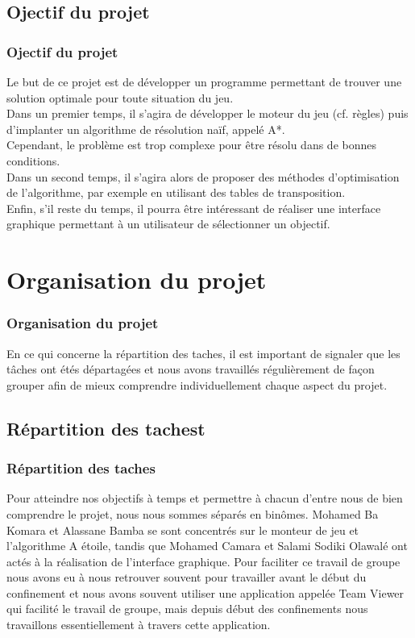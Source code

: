 \documentclass{beamer}
\begin{document}
	\subsection{Ojectif du projet}
	\begin{frame}
		\frametitle{Ojectif du projet}
		
		Le but de ce projet est de développer un programme permettant de trouver une solution optimale pour toute situation du jeu. 
		\\Dans un premier temps, il s'agira de développer le moteur du jeu (cf. règles) puis d'implanter un algorithme de résolution naïf, appelé A*. 
		\\Cependant, le problème est trop complexe pour être résolu dans de bonnes conditions. 
		\\Dans un second temps, il s'agira alors de proposer des méthodes d'optimisation de l'algorithme, par exemple en utilisant des tables de transposition. 
		\\Enfin, s'il reste du temps, il pourra être intéressant de réaliser une interface graphique permettant à un utilisateur de sélectionner un objectif. 
		
	\end{frame}
	
	
	\section{Organisation du projet}
	
	\begin{frame}
		\frametitle{Organisation du projet}
		
		En ce qui concerne la répartition des taches, il est important de signaler que les tâches ont étés  départagées et nous avons travaillés régulièrement de façon grouper	afin de mieux comprendre individuellement chaque aspect du projet. 
		
	\end{frame}
	
	\subsection{Répartition des tachest}
	\begin{frame}
		\frametitle{Répartition des taches}
		
		Pour atteindre nos objectifs à temps et permettre à chacun d’entre nous de bien comprendre le projet, nous nous sommes séparés en binômes. Mohamed Ba Komara et Alassane Bamba se sont concentrés sur le monteur de jeu et l’algorithme A étoile, tandis que Mohamed Camara et Salami Sodiki Olawalé ont actés à la réalisation de l’interface graphique.
		Pour faciliter ce travail de groupe nous avons eu à nous retrouver souvent pour travailler avant le début du confinement et nous avons souvent utiliser une application appelée Team Viewer qui facilité le travail de groupe, mais depuis début des confinements nous travaillons essentiellement à travers cette application. 
		\end{frame}
	
\end{document}
